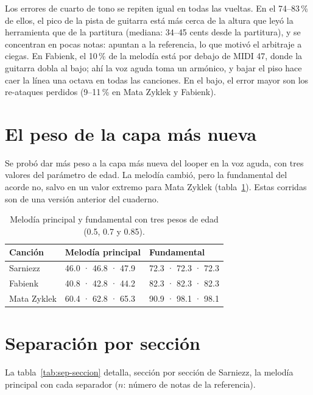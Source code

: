 Los errores de cuarto de tono se repiten igual en todas las vueltas. En el 74--83\,\% de ellos, el pico de la pista de
guitarra está más cerca de la altura que leyó la herramienta que de la partitura (mediana: 34--45 cents desde la
partitura), y se concentran en pocas notas: apuntan a la referencia, lo que motivó el arbitraje a ciegas. En Fabienk, el
10\,\% de la melodía está por debajo de MIDI 47, donde la guitarra dobla al bajo; ahí la voz aguda toma un armónico, y bajar
el piso hace caer la línea una octava en todas las canciones. En el bajo, el error mayor son los re-ataques perdidos
(9--11\,\% en Mata Zyklek y Fabienk).

\section{El peso de la capa más nueva}

Se probó dar más peso a la capa más nueva del looper en la voz aguda, con tres valores del parámetro de edad. La melodía
cambió, pero la fundamental del acorde no, salvo en un valor extremo para Mata Zyklek (tabla~\ref{tab:edad}). Estas
corridas son de una versión anterior del cuaderno.

\begin{table}[ht]
  \centering\small
  \caption{Melodía principal y fundamental con tres pesos de edad (0.5, 0.7 y 0.85).}\label{tab:edad}
  \begin{tabular}{@{}lll@{}}
    \toprule
    Canción & Melodía principal & Fundamental \\
    \midrule
    Sarniezz & 46.0 · 46.8 · 47.9 & 72.3 · 72.3 · 72.3 \\
    Fabienk & 40.8 · 42.8 · 44.2 & 82.3 · 82.3 · 82.3 \\
    Mata Zyklek & 60.4 · 62.8 · 65.3 & 90.9 · 98.1 · 98.1 \\
    \bottomrule
  \end{tabular}
\end{table}

\section{Separación por sección}

La tabla~\ref{tab:sep-seccion} detalla, sección por sección de Sarniezz, la melodía principal con cada separador
($n$: número de notas de la referencia).

